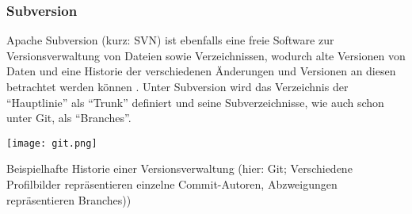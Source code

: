 \subsubsection{Subversion} \label{svn}
Apache Subversion (kurz: SVN) ist ebenfalls eine freie Software zur Versionsverwaltung von Dateien sowie Verzeichnissen, wodurch alte Versionen von Daten und eine Historie der verschiedenen Änderungen und Versionen an diesen betrachtet werden können \cite{Collins-Sussman:2004aa}.
Unter Subversion wird das Verzeichnis der \enquote{Hauptlinie} als \enquote{Trunk} definiert und seine Subverzeichnisse, wie auch schon unter Git, als \enquote{Branches}.
\begin{marginfigure}
    \texttt{[image: git.png]}
    \caption{\label{fig:git}Beispielhafte Historie einer Versionsverwaltung (hier: Git; Verschiedene Profilbilder repräsentieren einzelne Commit-Autoren, Abzweigungen repräsentieren Branches))}
\end{marginfigure}

